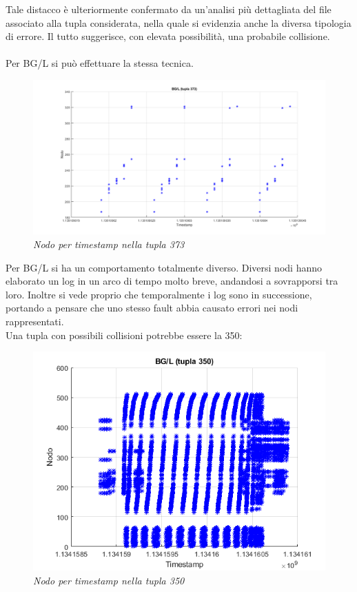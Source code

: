 Tale distacco è ulteriormente confermato da un'analisi più dettagliata del file associato alla tupla considerata, nella quale si evidenzia anche la diversa tipologia di errore. Il tutto suggerisce, con elevata possibilità, una probabile collisione.
\\
\\
Per BG/L si può effettuare la stessa tecnica.
\begin{figure}[H]
	\centering
	\includegraphics[width=\textwidth]{img/hw6/collisione_bgl.png}
	\caption{\textit{Nodo per timestamp nella tupla 373}}
\end{figure}
Per BG/L si ha un comportamento totalmente diverso. Diversi nodi hanno elaborato un log in un arco di tempo molto breve, andandosi a sovrapporsi tra loro. Inoltre si vede proprio che temporalmente i log sono in successione, portando a pensare che uno stesso fault abbia causato errori nei nodi rappresentati.
\\Una tupla con possibili collisioni potrebbe essere la 350:
\begin{figure}[H]
	\centering
	\includegraphics[width=\textwidth]{img/hw6/tupla_350.png}
	\caption{\textit{Nodo per timestamp nella tupla 350}}
\end{figure}

